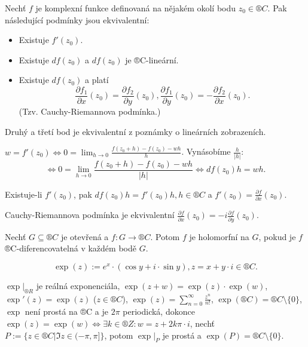 \documentclass[12pt]{article}					%
\begin{document}
\begin{veta}
	Nechť $f$ je komplexní funkce definovaná na nějakém okolí bodu $z_0 \in ®C$. Pak následující podmínky jsou ekvivalentní:
	
	\begin{itemize}
		\item Existuje $f'(z_0)$.
		\item Existuje $d f(z_0)$ a $d f(z_0)$ je ®C-lineární.
		\item Existuje $d f(z_0)$ a platí
			$$ \frac{\partial f_1}{\partial x}(z_0) = \frac{\partial f_2}{\partial y}(z_0), \frac{\partial f_1}{\partial y}(z_0) = - \frac{\partial f_2}{\partial x}(z_0). $$
			(Tzv. Cauchy-Riemannova podmínka.)
	\end{itemize}

	\begin{dukazin}
		Druhý a třetí bod je ekvivalentní z poznámky o lineárních zobrazeních.

		$w = f'(z_0) \Leftrightarrow 0 = \lim_{h \rightarrow 0} \frac{f(z_0 + h) - f(z_0) - w h}{h}$. Vynásobíme $\frac{h}{|h|}$:
		$$ \Leftrightarrow 0 = \lim_{h \rightarrow 0} \frac{f(z_0 + h) - f(z_0) - wh}{|h|} \Leftrightarrow df(z_0) h = wh. $$
	\end{dukazin}
\end{veta}

\begin{poznamka}
	Existuje-li $f'(z_0)$, pak $df(z_0)h = f'(z_0)h, h \in ®C$ a $f'(z_0) = \frac{\partial f}{\partial x}(z_0)$.

	Cauchy-Riemannova podmínka je ekvivalentní $\frac{\partial f}{\partial x}(z_0) = -i \frac{\partial f}{\partial y}(z_0)$.
\end{poznamka}


\begin{definice}
	Nechť $G \subseteq ®C$ je otevřená a $f: G \rightarrow ®C$. Potom $f$ je holomorfní na $G$, pokud je $f$ ®C-diferencovatelná v každém bodě $G$.
\end{definice}

\begin{definice}[Exponenciála]
	$$ \exp(z) := e^x·(\cos y + i·\sin y), z = x + y·i \in ®C. $$
\end{definice}

\begin{tvrzeni}
	$\exp|_{®R}$ je reálná exponenciála, $\exp(z + w) = \exp(z)·\exp(w)$, $\exp'(z) = \exp(z)$ ($z \in ®C$), $\exp(z) = \sum_{n=0}^∞ \frac{z^n}{n!}$, $\exp(®C) = ®C \setminus \{ 0 \}$, $\exp$ není prostá na ®C a je $2\pi$ periodická, dokonce $\exp(z) = \exp(w) \Leftrightarrow \exists k \in ®Z: w = z + 2k\pi·i$, nechť $P := \{z \in ®C | \Im z \in (-\pi, \pi]\}$, potom $\exp|_P$ je prostá a $\exp(P) = ®C \setminus \{0\}$.
\end{tvrzeni}
\end{document}
